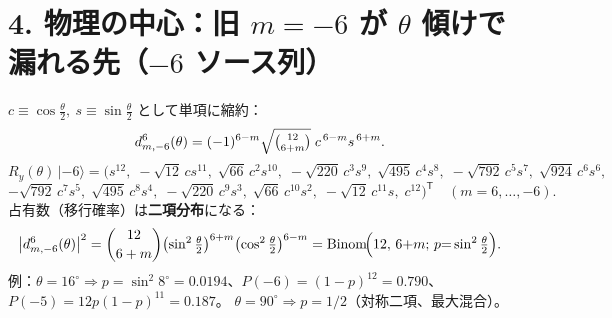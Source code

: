 \documentclass[a4paper,11pt]{ltjsarticle}
\begin{document}
\section*{4. 物理の中心：旧 $m{=}{-}6$ が $\theta$ 傾けで漏れる先（$-6$ ソース列）}
$c\equiv\cos\tfrac\theta2,\ s\equiv\sin\tfrac\theta2$ として単項に縮約：
\[
d^{6}_{m,-6}(\theta)=(-1)^{6-m}\sqrt{\tbinom{12}{6+m}}\;c^{\,6-m}s^{\,6+m}.
\]
\[
R_y(\theta)\,|{-}6\rangle=\bigl(
s^{12},\;
-\sqrt{12}\,cs^{11},\;
\sqrt{66}\,c^{2}s^{10},\;
-\sqrt{220}\,c^{3}s^{9},\;
\sqrt{495}\,c^{4}s^{8},\;
-\sqrt{792}\,c^{5}s^{7},\;
\sqrt{924}\,c^{6}s^{6},
\]
\[
-\sqrt{792}\,c^{7}s^{5},\;
\sqrt{495}\,c^{8}s^{4},\;
-\sqrt{220}\,c^{9}s^{3},\;
\sqrt{66}\,c^{10}s^{2},\;
-\sqrt{12}\,c^{11}s,\;
c^{12}
\bigr)^{\mathsf T}\quad(m=6,\dots,-6).
\]
占有数（移行確率）は\textbf{二項分布}になる：
\[
\bigl|d^{6}_{m,-6}(\theta)\bigr|^{2}
=\binom{12}{6+m}\bigl(\sin^{2}\tfrac\theta2\bigr)^{6+m}\bigl(\cos^{2}\tfrac\theta2\bigr)^{6-m}
=\mathrm{Binom}\!\Bigl(12,\,6{+}m;\,p{=}\sin^{2}\tfrac\theta2\Bigr).
\]
例：$\theta{=}16^\circ\Rightarrow p{=}\sin^2 8^\circ{=}0.0194$、$P({-}6){=}(1{-}p)^{12}{=}0.790$、$P({-}5){=}12p(1{-}p)^{11}{=}0.187$。
$\theta{=}90^\circ\Rightarrow p{=}1/2$（対称二項、最大混合）。
\end{document}
